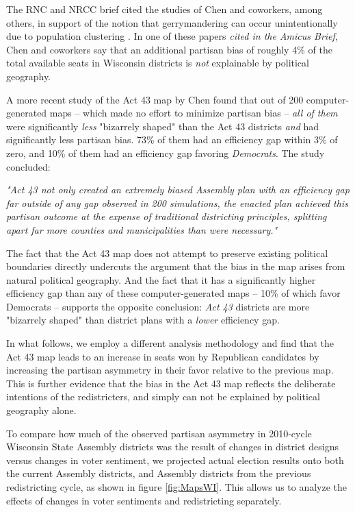 \documentclass[preprint,12pt]{article}
\begin{document}
The RNC and NRCC brief cited the studies of Chen and coworkers, among others, in support of the notion that gerrymandering can occur unintentionally due to population clustering \cite{Chen_2015_10.1089/elj.2015.0317,Chen_2016_10.1016/j.electstud.2016.06.014}.
In one of these papers \emph{cited in the Amicus Brief}, Chen and coworkers say that an additional partisan bias of roughly 4\% of the total available seats in Wisconsin districts is \emph{not} explainable by political geography.

A more recent study of the Act 43 map by Chen \cite{Chen_2017_} found that out of 200 computer-generated maps -- which made no effort to minimize partisan bias --  \emph{all of them} were significantly \emph{less} "bizarrely shaped" than the Act 43 districts \emph{and} had significantly less partisan bias.
73\% of them had an efficiency gap within 3\% of zero, and 10\% of them had an efficiency gap favoring \emph{Democrats}.
The study concluded:

\emph{"Act 43 not only created an extremely biased Assembly plan with an efficiency gap far outside of any gap observed in 200 simulations, the enacted plan achieved this partisan outcome at the expense of traditional districting principles, splitting apart far more counties and municipalities than were necessary."}

The fact that the Act 43 map does not attempt to preserve existing political boundaries directly undercuts the argument that the bias in the map arises from natural political geography.
And the fact that it has a significantly higher efficiency gap than any of these computer-generated maps -- 10\% of which favor Democrats -- supports the opposite conclusion: \emph{Act 43} districts are more "bizarrely shaped" than district plans with a \emph{lower} efficiency gap.

In what follows, we employ a different analysis methodology and find that the Act 43 map leads to an increase in seats won by Republican candidates by increasing the partisan asymmetry in their favor relative to the previous map.
This is further evidence that the bias in the Act 43 map reflects the deliberate intentions of the redistricters, and simply can not be explained by political geography alone.

To compare how much of the observed partisan asymmetry in 2010-cycle Wisconsin State Assembly districts was the result of changes in district designs versus changes in voter sentiment, we projected actual election results onto both the current Assembly districts, and Assembly districts from the previous redistricting cycle, as shown in figure \ref{fig:MapsWI}.
This allows us to analyze the effects of changes in voter sentiments and redistricting separately.
\end{document}
